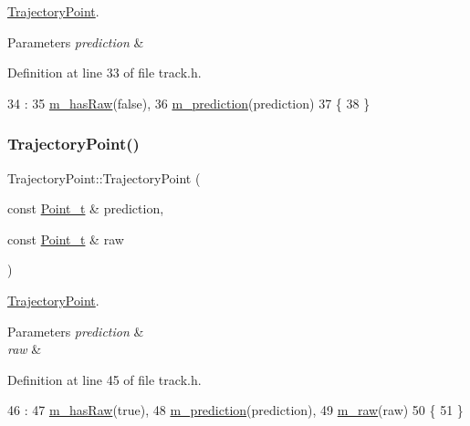 \mbox{\hyperlink{struct_trajectory_point}{Trajectory\+Point}}. 


\begin{DoxyParams}{Parameters}
{\em prediction} & \\
\hline
\end{DoxyParams}


Definition at line 33 of file track.\+h.


\begin{DoxyCode}
34         :
35           \mbox{\hyperlink{struct_trajectory_point_aedf0113745aff30b359a60401ddcf076}{m\_hasRaw}}(\textcolor{keyword}{false}),
36           \mbox{\hyperlink{struct_trajectory_point_a967909b451c226e4927a2b96fcecbb6e}{m\_prediction}}(prediction)
37     \{
38     \}
\end{DoxyCode}
\mbox{\label{struct_trajectory_point_ae7b2bd691827713c879b04824a60ec03}} 
\subsubsection{\texorpdfstring{Trajectory\+Point()}{TrajectoryPoint()}\hspace{0.1cm}{\footnotesize\ttfamily [3/3]}}
{\footnotesize\ttfamily Trajectory\+Point\+::\+Trajectory\+Point (\begin{DoxyParamCaption}\item[{const \mbox{\hyperlink{defines_8h_a8c42696da8f098b91374a8e8bb84b430}{Point\+\_\+t}} \&}]{prediction,  }\item[{const \mbox{\hyperlink{defines_8h_a8c42696da8f098b91374a8e8bb84b430}{Point\+\_\+t}} \&}]{raw }\end{DoxyParamCaption})\hspace{0.3cm}{\ttfamily [inline]}}



\mbox{\hyperlink{struct_trajectory_point}{Trajectory\+Point}}. 


\begin{DoxyParams}{Parameters}
{\em prediction} & \\
\hline
{\em raw} & \\
\hline
\end{DoxyParams}


Definition at line 45 of file track.\+h.


\begin{DoxyCode}
46         :
47           \mbox{\hyperlink{struct_trajectory_point_aedf0113745aff30b359a60401ddcf076}{m\_hasRaw}}(\textcolor{keyword}{true}),
48           \mbox{\hyperlink{struct_trajectory_point_a967909b451c226e4927a2b96fcecbb6e}{m\_prediction}}(prediction),
49           \mbox{\hyperlink{struct_trajectory_point_abb88f38dcc0abe8f428421a9fbf6a839}{m\_raw}}(raw)
50     \{
51     \}
\end{DoxyCode}


